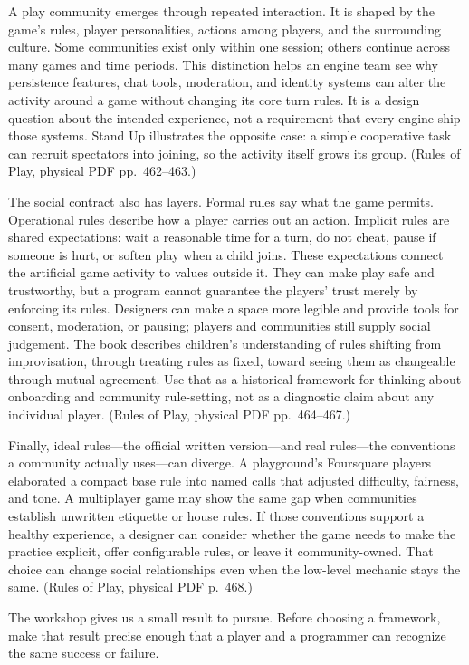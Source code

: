 A play community emerges through repeated interaction. It is shaped by the game's rules, player personalities, actions among players, and the surrounding culture. Some communities exist only within one session; others continue across many games and time periods. This distinction helps an engine team see why persistence features, chat tools, moderation, and identity systems can alter the activity around a game without changing its core turn rules. It is a design question about the intended experience, not a requirement that every engine ship those systems. Stand Up illustrates the opposite case: a simple cooperative task can recruit spectators into joining, so the activity itself grows its group. (Rules of Play, physical PDF pp.~462--463.)

The social contract also has layers. Formal rules say what the game permits. Operational rules describe how a player carries out an action. Implicit rules are shared expectations: wait a reasonable time for a turn, do not cheat, pause if someone is hurt, or soften play when a child joins. These expectations connect the artificial game activity to values outside it. They can make play safe and trustworthy, but a program cannot guarantee the players' trust merely by enforcing its rules. Designers can make a space more legible and provide tools for consent, moderation, or pausing; players and communities still supply social judgement. The book describes children's understanding of rules shifting from improvisation, through treating rules as fixed, toward seeing them as changeable through mutual agreement. Use that as a historical framework for thinking about onboarding and community rule-setting, not as a diagnostic claim about any individual player. (Rules of Play, physical PDF pp.~464--467.)

Finally, ideal rules---the official written version---and real rules---the conventions a community actually uses---can diverge. A playground's Foursquare players elaborated a compact base rule into named calls that adjusted difficulty, fairness, and tone. A multiplayer game may show the same gap when communities establish unwritten etiquette or house rules. If those conventions support a healthy experience, a designer can consider whether the game needs to make the practice explicit, offer configurable rules, or leave it community-owned. That choice can change social relationships even when the low-level mechanic stays the same. (Rules of Play, physical PDF p.~468.)

The workshop gives us a small result to pursue. Before choosing a framework, make that result precise enough that a player and a programmer can recognize the same success or failure.

